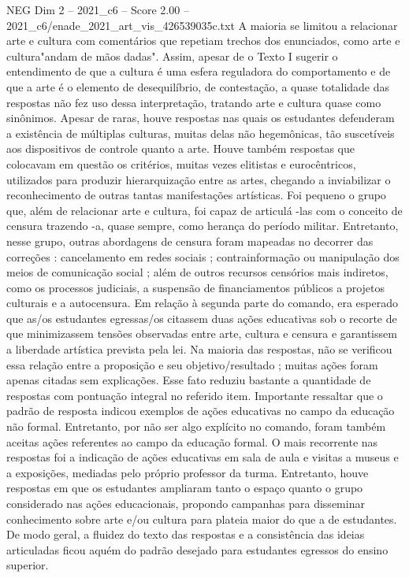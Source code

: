 \begin{textsample}{NEG Dim 2 – 2021\_c6 – Score 2.00 – 2021\_c6/enade\_2021\_art\_vis\_426539035c.txt}
A maioria se limitou a relacionar arte e cultura com comentários que repetiam trechos dos enunciados, como arte e cultura"andam de mãos dadas".
Assim, apesar de o Texto I sugerir o entendimento de que a cultura é uma esfera reguladora do comportamento e de que a arte é o elemento de desequilíbrio, de contestação, a quase totalidade das respostas não fez uso dessa interpretação, tratando arte e cultura quase como sinônimos.
Apesar de raras, houve respostas nas quais os estudantes defenderam a existência de múltiplas culturas, muitas delas não hegemônicas, tão suscetíveis aos dispositivos de controle quanto a arte.
Houve também respostas que colocavam em questão os critérios, muitas vezes elitistas e eurocêntricos, utilizados para produzir hierarquização entre as artes, chegando a inviabilizar o reconhecimento de outras tantas manifestações artísticas.
Foi pequeno o grupo que, além de relacionar arte e cultura, foi capaz de articulá -las com o conceito de censura trazendo -a, quase sempre, como herança do período militar.
Entretanto, nesse grupo, outras abordagens de censura foram mapeadas no decorrer das correções : cancelamento em redes sociais ; contrainformação ou manipulação dos meios de comunicação social ; além de outros recursos censórios mais indiretos, como os processos judiciais, a suspensão de financiamentos públicos a projetos culturais e a autocensura.
Em relação à segunda parte do comando, era esperado que as/os estudantes egressas/os citassem duas ações educativas sob o recorte de que minimizassem tensões observadas entre arte, cultura e censura e garantissem a liberdade artística prevista pela lei.
Na maioria das respostas, não se verificou essa relação entre a proposição e seu objetivo/resultado ; muitas ações foram apenas citadas sem explicações.
Esse fato reduziu bastante a quantidade de respostas com pontuação integral no referido item.
Importante ressaltar que o padrão de resposta indicou exemplos de ações educativas no campo da educação não formal.
Entretanto, por não ser algo explícito no comando, foram também aceitas ações referentes ao campo da educação formal.
O mais recorrente nas respostas foi a indicação de ações educativas em sala de aula e visitas a museus e a exposições, mediadas pelo próprio professor da turma.
Entretanto, houve respostas em que os estudantes ampliaram tanto o espaço quanto o grupo considerado nas ações educacionais, propondo campanhas para disseminar conhecimento sobre arte e/ou cultura para plateia maior do que a de estudantes.
De modo geral, a fluidez do texto das respostas e a consistência das ideias articuladas ficou aquém do padrão desejado para estudantes egressos do ensino superior.

\end{textsample}
